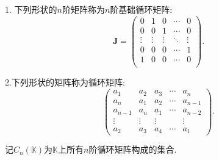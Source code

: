 \documentclass[lang=cn,newtx,10pt,scheme=chinese]{elegantbook}
\begin{document}
\begin{definition}[循环矩阵]\label{definition:循环矩阵}
1.    下列形状的$n$阶矩阵称为\(n\)阶基础循环矩阵:
\[ 
\boldsymbol{J}=
\left( \begin{matrix}
0&		1&		0&		\cdots&		0\\
0&		0&		1&		\cdots&		0\\
\vdots&		\vdots&		\vdots&	\ddots&		\vdots\\
0&		0&		0&		\cdots&		1\\
1&		0&		0&		\cdots&		0\\
\end{matrix} \right).
\]

2.下列形状的矩阵称为循环矩阵:
\[
\begin{pmatrix}
a_1 & a_2 & a_3 & \cdots & a_n \\
a_n & a_1 & a_2 & \cdots & a_{n - 1} \\
a_{n - 1} & a_n & a_1 & \cdots & a_{n - 2} \\
\vdots & \vdots & \vdots & & \vdots \\
a_2 & a_3 & a_4 & \cdots & a_1
\end{pmatrix}.
\]
\end{definition}
\begin{note}
记\(C_n(\mathbb{K})\)为\(\mathbb{K}\)上所有\(n\)阶循环矩阵构成的集合.
\end{note}
\end{document}
